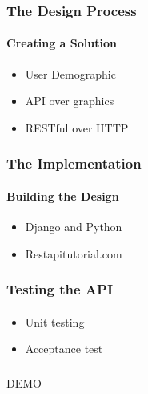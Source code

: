 \begin{frame}
    \frametitle{The Design Process}
    \framesubtitle{Creating a Solution}
    \begin{itemize}
    	\item User Demographic
    	\item API over graphics
    	\item RESTful over HTTP
    \end{itemize}
\end{frame}

\begin{frame}
    \frametitle{The Implementation}
    \framesubtitle{Building the Design}
    \begin{itemize}
    	\item Django and Python
    	\item Restapitutorial.com
    \end{itemize}
\end{frame}

\begin{frame}
    \frametitle{Testing the API}
    \framesubtitle{}
    \begin{itemize}
    	\item Unit testing
    	\item Acceptance test
    \end{itemize}
\end{frame}

\begin{frame}
  \frametitle{}
  \begin{center}
    {\Huge DEMO}
  \end{center}
\end{frame}

